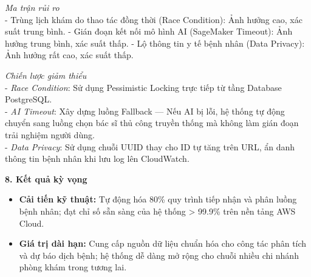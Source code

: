 \emph{Ma trận rủi ro}\\
- Trùng lịch khám do thao tác đồng thời (Race Condition): Ảnh hưởng cao,
xác suất trung bình. - Gián đoạn kết nối mô hình AI (SageMaker Timeout):
Ảnh hưởng trung bình, xác suất thấp. - Lộ thông tin y tế bệnh nhân (Data
Privacy): Ảnh hưởng rất cao, xác suất thấp.

\emph{Chiến lược giảm thiểu}\\
- \emph{Race Condition}: Sử dụng Pessimistic Locking trực tiếp từ tầng
Database PostgreSQL.\\
- \emph{AI Timeout}: Xây dựng luồng Fallback --- Nếu AI bị lỗi, hệ thống
tự động chuyển sang luồng chọn bác sĩ thủ công truyền thống mà không làm
gián đoạn trải nghiệm người dùng.\\
- \emph{Data Privacy}: Sử dụng chuỗi UUID thay cho ID tự tăng trên URL,
ẩn danh thông tin bệnh nhân khi lưu log lên CloudWatch.

\vspace{0.5em}\noindent\textbf{8. Kết quả kỳ vọng}

\begin{itemize}
\tightlist
\item
  \textbf{Cải tiến kỹ thuật:} Tự động hóa 80\% quy trình tiếp nhận và
  phân luồng bệnh nhân; đạt chỉ số sẵn sàng của hệ thống \textgreater{}
  99.9\% trên nền tảng AWS Cloud.\\
\item
  \textbf{Giá trị dài hạn:} Cung cấp nguồn dữ liệu chuẩn hóa cho công
  tác phân tích và dự báo dịch bệnh; hệ thống dễ dàng mở rộng cho chuỗi
  nhiều chi nhánh phòng khám trong tương lai.
\end{itemize}
